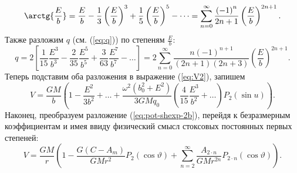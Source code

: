 \documentclass[11pt, a4paper,addpoints]{exam}
\theoremstyle{remark}
\renewcommand{\theta}{\vartheta}
\begin{document}
\begin{equation}
    \arctg{\dfrac{E}{b}} = 
    \dfrac{E}{b} - \dfrac{1}{3}\left( \dfrac{E}{b} \right)^3 + \dfrac{1}{5} \left(\dfrac{E}{b}
    \right)^5 - \dots =
    \sum\limits_{n=0}^{\infty}\dfrac{\left( -1 \right)^n}{2n + 1} \left(\dfrac{E}{b}\right)^{2n+1}.
    \label{eq:arctg-series}
\end{equation}
Также разложим $q$ (см. (\ref{eq:q})) по степеням $\frac{E}{b}$:
\begin{equation}
    q = 2\left[ \dfrac{1}{15} \dfrac{E^3}{b^3} - \dfrac{2}{35}\dfrac{E^5}{b^5} + \dfrac{3}{63}\dfrac{E^7}{b^7} - \dots \right] = 
    2\sum\limits_{n=0}^{\infty} \dfrac{n \left( -1 \right)^{n+1}}{\left( 2n+1 \right)\left( 2n+3
    \right)}\left(\dfrac{E}{b}\right)^{2n+1}.
    \label{eq:q-series}
\end{equation}
Теперь подставим оба разложения в выражение (\ref{eq:V2}), запишем
\begin{equation}
    V = \dfrac{GM}{b} \left( 1 - \dfrac{E^2}{3b^2} + \dots + \dfrac{\omega^2 \left( b_0^2 + E^2
    \right)}{3GMq_0} \left( \dfrac{4}{15}\dfrac{E^3}{b^2} + \dots \right) P_2 \left( \sin{u} \right)
\right).
\label{eq:Vexp}
\end{equation}
Наконец, преобразуем разложение (\ref{eq:pot-shexp-2b}), перейдя к безразмерным коэффициентам и имея ввиду физический смысл стоксовых
постоянных первых степеней: 
\begin{equation}
    V = \dfrac{GM}{r} \left( 1 - \dfrac{G\left( C - A_m \right)}{GM r^2} P_2\left( \cos{\theta}\right) +
        \sum\limits_{n = 2}^{\infty} \dfrac{A_{2\cdot n}}{GMr^{2n}} P_{2\cdot n}\left( \cos{\theta}
    \right) \right).
\label{eq:pot-shexp-new}
\end{equation}
\end{document}
